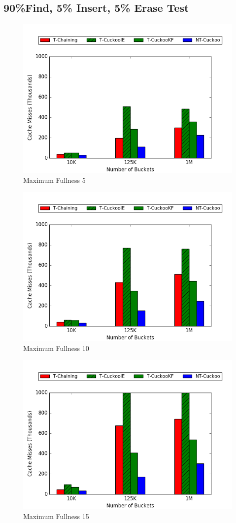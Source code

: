 \subsection{90\%Find, 5\% Insert, 5\% Erase Test}

\begin{figure}[H]
    \centering
        \includegraphics[width=0.75\linewidth]{maps/905cm.png}
        \caption*{Maximum Fullness 5}
\end{figure}
\begin{figure}[H]
    \centering
        \includegraphics[width=0.75\linewidth]{maps/9010cm.png}
        \caption*{Maximum Fullness 10}
\end{figure}
\begin{figure}[H]
    \centering
        \includegraphics[width=0.75\linewidth]{maps/9015cm.png}
        \caption*{Maximum Fullness 15}
\end{figure}




